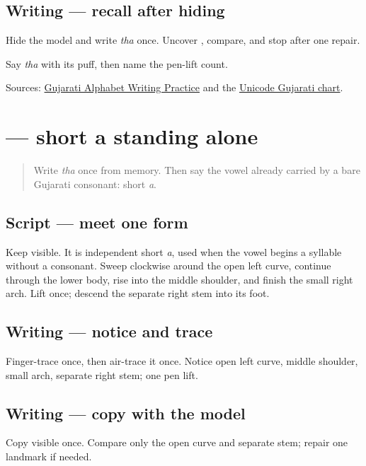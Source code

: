 \subsection*{Writing — recall after hiding}
Hide the model and write \emph{tha} once. Uncover \textbf{}, compare, and stop after one repair.

\begin{tcolorbox}[breakable,colback=teal!4,colframe=teal!35!black,title={Before you move on}]
Say \emph{tha} with its puff, then name the pen-lift count.

Sources: \href{https://www.t30apps.com/gujarati-alphabet-writing/}{Gujarati Alphabet Writing Practice} and the \href{https://www.unicode.org/charts/PDF/U0A80.pdf}{Unicode Gujarati chart}.
\end{tcolorbox}
\section[\texorpdfstring{\gu{અ} (a)}{અ (a)}]{ — short a standing alone}

\label{lesson:GU-W04-independent-a}



\begin{quote}
Write \emph{tha} once from memory. Then say the vowel already carried by a bare Gujarati consonant: short \emph{a}.
\end{quote}

\subsection*{Script — meet one form}
Keep \textbf{} visible. It is independent short \emph{a}, used when the vowel begins a syllable without a consonant. Sweep clockwise around the open left curve, continue through the lower body, rise into the middle shoulder, and finish the small right arch. Lift once; descend the separate right stem into its foot.

\subsection*{Writing — notice and trace}

Finger-trace \textbf{} once, then air-trace it once. Notice open left curve, middle shoulder, small arch, separate right stem; one pen lift.

\subsection*{Writing — copy with the model}
Copy visible \textbf{} once. Compare only the open curve and separate stem; repair one landmark if needed.

